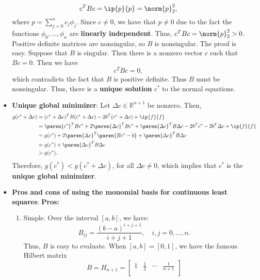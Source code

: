 \documentclass{report}
\begin{document}
\begin{itemize}
                $$c^T B c = \ip{p}{p} = \norm{p}_2^2,$$
                where $p = \sum_{j=0}^n c_j \phi_j$. Since $c \neq 0$, we have that $p \neq 0$ due to the fact the functions $\phi_0,\ldots,\phi_n$ are \textbf{linearly independent}. Thus, $c^T B c = \norm{p}_2^2 > 0$.
                \bigbreak \noindent 
                Positive definite matrices are nonsingular, so $B$ is nonsingular.
                \bigbreak \noindent 
                The proof is easy. Suppose that $B$ is singular. Then there is a nonzero vector $c$ such that $Bc = 0$. Then we have
                $$c^T B c = 0,$$
                which contradicts the fact that $B$ is positive definite. Thus $B$ must be nonsingular.
                Thus, there is a \textbf{unique solution} $c^*$ to the normal equations.
            \item \textbf{ Unique global minimizer}:
                Let $\Delta c \in \mathbb{R}^{n+1}$ be nonzero. Then,
                \begin{align*}
                    g(c^* + \Delta c) 
&=  (c^* + \Delta c)^T B (c^* + \Delta c) - 2b^T (c^* + \Delta c) + \ip{f}{f}\\
&=  \paren{c^*}^T B c^* + 2\paren{\Delta c}^T B c^* +  \paren{\Delta c}^T B \Delta c - 2b^T c^* - 2b^T \Delta c + \ip{f}{f}\\
&= g(c^*) + 2\paren{\Delta c}^T \paren{B c^* - b} +  \paren{\Delta c}^T B \Delta c \\
&= g(c^*) +  \paren{\Delta c}^T B \Delta c \\
&> g(c^*). \\
                \end{align*}
                Therefore, $g(c^*) < g(c^* + \Delta c)$, for all $\Delta c \neq 0$, which implies that $c^*$ is the \textbf{unique global minimizer}.
            \item \textbf{Pros and cons of using the monomial basis for continuous least squares}:
                \textbf{Pros:}
                \begin{enumerate}
                    \item Simple. Over the interval $[a,b]$, we have:
                    $$B_{ij} = \frac{(b-a)^{i+j+1}}{i+j+1}, \quad i,j = 0,\ldots,n.$$
                    Thus, $B$ is easy to evaluate. When $[a,b] = [0,1]$, we have the famous Hilbert matrix
                    $$B = H_{n+1} =
                    \begin{bmatrix}
                        1 & \frac{1}{2} & \cdots & \frac{1}{n+1} \\

\end{bmatrix}$$
\end{enumerate}
\end{itemize}
\end{document}
